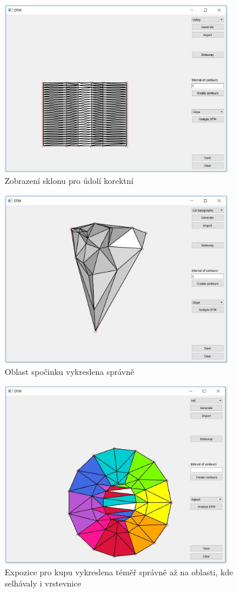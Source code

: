 \documentclass[a4paper, 12pt]{article}
\begin{document}
\begin{figure}[h!]
\centering
\includegraphics[width=10cm]{pictures/valley_sklon.jpg}
\caption{Zobrazení sklonu pro údolí korektní}
\end{figure}

\begin{figure}[h!]
\centering
\includegraphics[width=10cm]{pictures/spocinek_sklon.jpg}
\caption{Oblast spočinku vykreslena správně}
\end{figure}

\begin{figure}[h!]
\centering
\includegraphics[width=10cm]{pictures/hill_aspect.jpg}
\caption{Expozice pro kupu vykreslena téměř správně až na oblasti, kde selhávaly i vrstevnice}
\end{figure}
\end{document}
